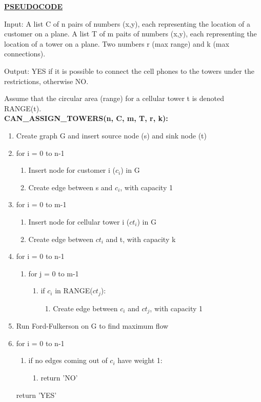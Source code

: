 \documentclass[11pt]{csc_assignment}
\begin{document}
\begin{description}
\underline{\textbf{PSEUDOCODE}}

Input: A list C of n pairs of numbers (x,y), each representing the location of a customer on a plane. A list T of m paits of numbers (x,y), each representing the location of a tower on a plane. Two numbers r (max range) and k (max connections).

Output: YES if it is possible to connect the cell phones to the towers under the restrictions, otherwise NO.

Assume that the circular area (range) for a cellular tower t is denoted RANGE(t). \\

\textbf{CAN\_ASSIGN\_TOWERS(n, C, m, T, r, k):}
\begin{enumerate}[leftmargin=5pt]
	\item[] Create graph G and insert source node (s) and sink node (t)
	\item[] for i = 0 to n-1
	\begin{enumerate}
		\item[] Insert node for customer i ($c_i$) in G
		\item[] Create edge between s and $c_i$, with capacity 1
	\end{enumerate}
	\item[] for i = 0 to m-1
	\begin{enumerate}
		\item[] Insert node for cellular tower i ($ct_i$) in G
		\item[] Create edge between $ct_i$ and t, with capacity k
	\end{enumerate}
	\item[] for i = 0 to n-1
	\begin{enumerate}
		\item[] for j = 0 to m-1
		\begin{enumerate}
			\item[] if $c_i$ in RANGE($ct_j$):
			\begin{enumerate}
				\item[] Create edge between $c_i$ and $ct_j$, with capacity 1
			\end{enumerate}
		\end{enumerate}
	\end{enumerate}
	\item[] Run Ford-Fulkerson on G to find maximum flow
	\clearpage
	\item[] for i = 0 to n-1
	\begin{enumerate}
		\item[] if no edges coming out of $c_i$ have weight 1:
		\begin{enumerate}
			\item[] return 'NO'
		\end{enumerate}
	\end{enumerate}
	return 'YES'
\end{enumerate}


\end{description}
\end{document}
